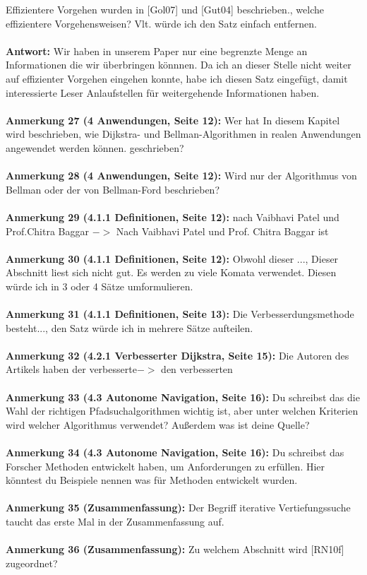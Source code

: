 \documentclass[a4paper,12pt]{book}
\begin{document}
\glqq Effizientere Vorgehen wurden in [Gol07] und [Gut04] beschrieben.\grqq, welche effizientere Vorgehensweisen? Vlt. würde ich den Satz einfach entfernen. 
\\ \\
\textbf{Antwort:}
Wir haben in unserem Paper nur eine begrenzte Menge an Informationen die wir überbringen könnnen. Da ich an dieser Stelle nicht weiter auf effizienter Vorgehen eingehen konnte, habe ich diesen Satz eingefügt, damit interessierte Leser Anlaufstellen für weitergehende Informationen haben.
\\ \\
\textbf{Anmerkung 27 (4 Anwendungen, Seite 12):}
Wer hat \glqq In diesem Kapitel wird beschrieben, wie Dijkstra- und Bellman-Algorithmen in realen Anwendungen angewendet werden können.\grqq{} geschrieben? 
\\ \\
\textbf{Anmerkung 28 (4 Anwendungen, Seite 12):}
Wird nur der Algorithmus von Bellman oder der von Bellman-Ford beschrieben?
\\ \\
\textbf{Anmerkung 29 (4.1.1 Definitionen, Seite 12):}
nach Vaibhavi Patel und Prof.Chitra Baggar $->$ Nach Vaibhavi Patel und Prof. Chitra Baggar ist
\\ \\
\textbf{Anmerkung 30 (4.1.1 Definitionen, Seite 12):}
\glqq Obwohl dieser ...\grqq, Dieser Abschnitt liest sich nicht gut. Es werden zu viele Komata verwendet. Diesen würde ich in 3 oder 4 Sätze umformulieren.  
\\ \\
\textbf{Anmerkung 31 (4.1.1 Definitionen, Seite 13):}
\glqq Die Verbesserdungsmethode besteht...\grqq, den Satz würde ich in mehrere Sätze aufteilen. 
\\ \\
\textbf{Anmerkung 32 (4.2.1 Verbesserter Dijkstra, Seite 15):}
\glqq Die Autoren des Artikels haben der verbesserte\grqq $->$ den verbesserten
\\ \\
\textbf{Anmerkung 33 (4.3 Autonome Navigation, Seite 16):}
Du schreibst das die Wahl der richtigen Pfadsuchalgorithmen wichtig ist, aber unter welchen Kriterien wird welcher Algorithmus verwendet? Außerdem was ist deine Quelle?
\\ \\
\textbf{Anmerkung 34 (4.3 Autonome Navigation, Seite 16):}
Du schreibst das Forscher Methoden entwickelt haben, um Anforderungen zu erfüllen. Hier könntest du Beispiele nennen was für Methoden entwickelt wurden. 
\\ \\
\textbf{Anmerkung 35 (Zusammenfassung):}
Der Begriff iterative Vertiefungssuche taucht das erste Mal in der Zusammenfassung auf. 
\\ \\
\textbf{Anmerkung 36 (Zusammenfassung):}
Zu welchem Abschnitt wird [RN10f] zugeordnet?
\\ \\
\end{document}
